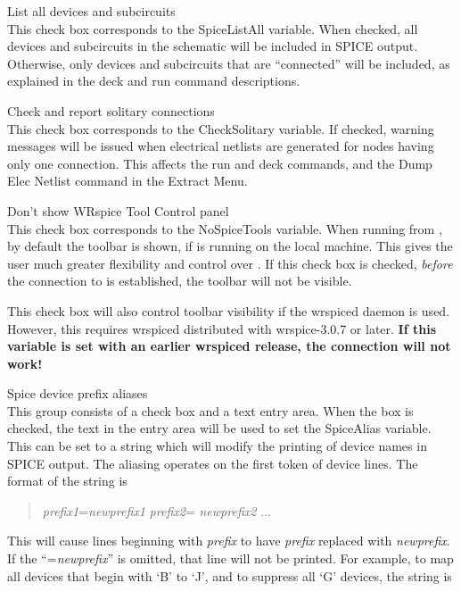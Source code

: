 \begin{description}
\item{\cb List all devices and subcircuits}\\
This check box corresponds to the {\et SpiceListAll} variable.  When
checked, all devices and subcircuits in the schematic will be included
in SPICE output.  Otherwise, only devices and subcircuits that are
``connected'' will be included, as explained in the {\cb deck} and
{\cb run} command descriptions.

\item{\cb Check and report solitary connections}\\
This check box corresponds to the {\et CheckSolitary} variable.  If
checked, warning messages will be issued when electrical netlists are
generated for nodes having only one connection.  This affects the {\cb
run} and {\cb deck} commands, and the {\cb Dump Elec Netlist} command
in the {\cb Extract Menu}.

\item{\cb Don't show WRspice Tool Control panel}\\
This check box corresponds to the {\et NoSpiceTools} variable.  When
running {\WRspice} from {\Xic}, by default the {\WRspice} toolbar is
shown, if {\WRspice} is running on the local machine.  This gives the
user much greater flexibility and control over {\WRspice}.  If this
check box is checked, {\it before} the connection to {\WRspice} is
established, the toolbar will not be visible.

This check box will also control toolbar visibility if the {\vt
wrspiced} daemon is used.  However, this requires {\vt wrspiced}
distributed with wrspice-3.0.7 or later.  {\bf If this variable is set
with an earlier {\vt wrspiced} release, the {\WRspice} connection will
not work!}

\item{\cb Spice device prefix aliases}\\
This group consists of a check box and a text entry area.  When the
box is checked, the text in the entry area will be used to set the
{\et SpiceAlias} variable.  This can be set to a string which will
modify the printing of device names in SPICE output.  The aliasing
operates on the first token of device lines.  The format of the string
is
\begin{quote}
{\it prefix1\/}{\vt =}{\it newprefix1} {\it prefix2\/}{\vt =}{\it
newprefix2} ...
\end{quote}

This will cause lines beginning with {\it prefix} to have {\it prefix}
replaced with {\it newprefix}.  If the ``{\vt =}{\it newprefix\/}'' is
omitted, that line will not be printed.  For example, to map all
devices that begin with `B' to `J', and to suppress all `G' devices,
the string is


\end{description}
